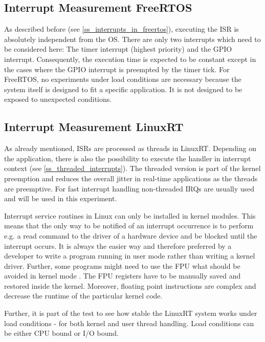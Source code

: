 \subsection{Interrupt Measurement FreeRTOS}
As described before (see \ref{ss_interrupts_in_freertos}), executing the \ac{ISR} is absolutely independent from the \ac{OS}.
There are only two interrupts which need to be considered here: The timer interrupt (highest priority) and the \ac{GPIO} interrupt.
Consequently, the execution time is expected to be constant except in the cases where the \ac{GPIO} interrupt is preempted by the timer tick.
For FreeRTOS, no experiments under load conditions are necessary because the system itself is designed to fit a specific application.
It is not designed to be exposed to unexpected conditions. 

\subsection{Interrupt Measurement LinuxRT}
As already mentioned, \acp{ISR} are processed as threads in LinuxRT.
Depending on the application, there is also the possibility to execute the handler in interrupt context (see \ref{ss_threaded_interrupts}).
The threaded version is part of the kernel preemption and reduces the overall jitter in real-time applications as the threads are preemptive.
For fast interrupt handling non-threaded \acp{IRQ} are usually used and will be used in this experiment. 
\par
Interrupt service routines in Linux can only be installed in kernel modules. 
This means that the only way to be notified of an interrupt occurrence is to perform e.g. a read command to the driver of a hardware device and be blocked until the interrupt occurs.
It is always the easier way and therefore preferred by a developer to write a program running in user mode rather than writing a kernel driver.
Further, some programs might need to use the \ac{FPU} what should be avoided in kernel mode \cite{love:lkd}.
The \ac{FPU} registers have to be manually saved and restored inside the kernel.
Moreover, floating point instructions are complex and decrease the runtime of the particular kernel code. 
\par
Further, it is part of the test to see how stable the LinuxRT system works under load conditions - for both kernel and user thread handling.
Load conditions can be either \ac{CPU} bound or \ac{I/O} bound. 
